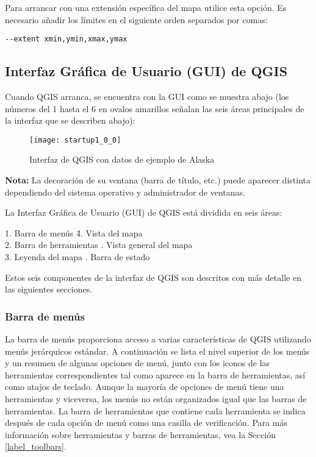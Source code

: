 Para arrancar con una extensión específica del mapa utilice esta opción. Es necesario
añadir los límites en el siguiente orden separados por comas:
\begin{verbatim}
--extent xmin,ymin,xmax,ymax
\end{verbatim}


\subsection{Interfaz Gráfica de Usuario (GUI) de QGIS}
\label{label_qgismainwindow}

Cuando QGIS arranca, se encuentra con la GUI como se muestra abajo
(los números del 1 hasta el 6 en ovalos amarillos señalan las seis áreas principales 
de la interfaz que se describen abajo):

\begin{figure}[ht]
   \begin{center}
   \caption{Interfaz de QGIS con datos de ejemplo de Alaska \wincaption}
	 \label{fig:startup}
   \texttt{[image: startup1\_0\_0]}
\end{center} 
\end{figure}

\textbf{Nota:} La decoración de su ventana (barra de título, etc.) puede aparecer 
distinta dependiendo del sistema operativo y administrador de ventanas.

La Interfaz Gráfica de Usuario (GUI) de QGIS está dividida en seis áreas:

\begin{tabbing}
1. Barra de menús \hspace{3cm}\= 4. Vista del mapa \\
2. Barra de herramientas \hspace{3cm}. Vista general del mapa \\
3. Leyenda del mapa \hspace{3cm}. Barra de estado   
\end{tabbing}

Estos seis componentes de la interfaz de QGIS son descritos con más detalle
en las siguientes secciones.

\subsubsection{Barra de menús}\label{label_menubar}

La barra de menús proporciona acceso a varias características de QGIS utilizando 
menús jerárquicos estándar. A continuación se lista el nivel superior de los menús
y un resumen de algunas opciones de menú, junto con los iconos de las herramientas
correspondientes tal como aparece en la barra de herramientas, así como atajos de
teclado. Aunque la mayoría de opciones de menú tiene una herramientas y viceversa,
los menús no están organizados igual que las barras de herramientas. La barra de
herramientas que contiene cada herramienta se indica después de cada opción de menú
como una casilla de verificación. Para más información sobre herramientas y barras
de herramientas, vea la Sección \ref{label_toolbars}.

